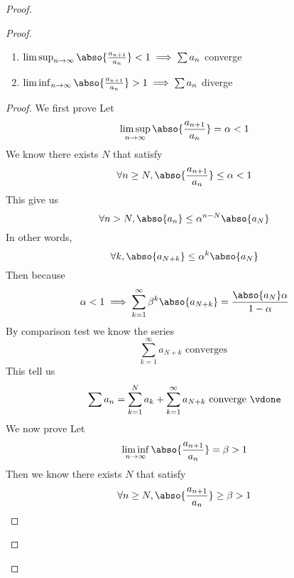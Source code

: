 \documentclass{report}
\begin{document}
\begin{proof}
\begin{proof}
\begin{theorem}
\begin{enumerate}[label=(\alph*)]
  \item  $\limsup_{n\to\infty} \abso{\frac{a_{n+1}}{a_n}}<1\implies \sum a_n$ converge\\
  \item $\liminf_{n\to\infty} \abso{\frac{a_{n+1}}{a_n}}> 1\implies \sum a_n$ diverge
\end{enumerate}
\end{theorem}
\begin{proof}
We first prove 
Let 
\begin{equation}
\limsup_{n\to\infty} \abso{\frac{a_{n+1}}{a_n}}=\alpha <1
\end{equation}
We know there exists $N$ that satisfy
 \begin{equation}
\forall n\geq N, \abso{\frac{a_{n+1}}{a_n}}\leq \alpha <1
\end{equation}
This give us
\begin{equation}
\forall n>N, \abso{a_n}\leq \alpha ^{n-N}\abso{a_N}
\end{equation}
In other words,
\begin{equation}
\forall k, \abso{a_{N+k}}\leq \alpha ^{k}\abso{a_N}
\end{equation}
Then because
\begin{equation}
\alpha <1\implies \sum_{k=1}^\infty \beta^{k} \abso{a_{N+k}}=\frac{\abso{a_N}\alpha  }{1-\alpha  }
\end{equation}
By comparison test we know the series
\begin{equation}
\sum_{k=1}^\infty a_{N+k}\text{ converges }
\end{equation}
This tell us
\begin{equation}
\sum a_n=\sum_{k=1}^N a_k+ \sum_{k=1}^\infty a_{N+k}\text{ converge }\vdone
\end{equation}
We now prove 
Let 
\begin{equation}
\liminf_{n\to\infty} \abso{\frac{a_{n+1}}{a_n}}=\beta >1
\end{equation}
Then we know there exists $N$ that satisfy
 \begin{equation}
\forall n\geq N, \abso{\frac{a_{n+1}}{a_n}}\geq \beta >1
\end{equation}

\end{proof}
\end{proof}
\end{proof}
\end{document}
